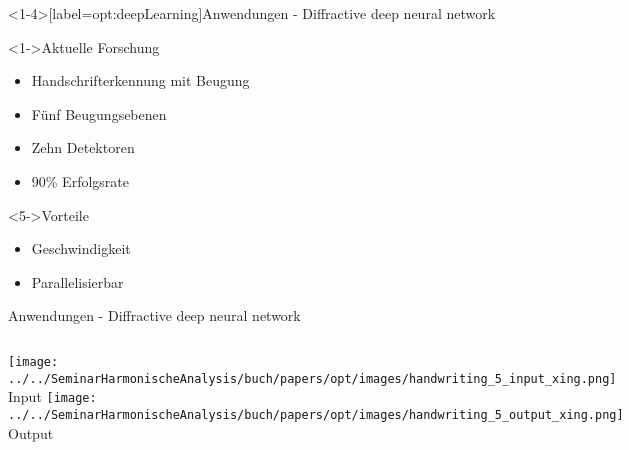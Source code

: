 \begin{frame}<1-4>[label=opt:deepLearning]{Anwendungen - Diffractive deep neural network}
    \begin{block}<1->{Aktuelle Forschung}
        \begin{itemize}
            \item<1-> Handschrifterkennung mit Beugung
            \item<2-> Fünf Beugungsebenen
            \item<3-> Zehn Detektoren
            \item<4-> 90\% Erfolgsrate
        \end{itemize}
    \end{block}
    \begin{block}<5->{Vorteile}
        \begin{itemize}
            \item<5-> Geschwindigkeit
            \item<6-> Parallelisierbar
        \end{itemize}
    \end{block}
\end{frame}


\begin{frame}{Anwendungen - Diffractive deep neural network}
    \centering
    \begin{columns}
        \texttt{[image: ../../SeminarHarmonischeAnalysis/buch/papers/opt/images/handwriting\_5\_input\_xing.png]}
        Input
        \texttt{[image: ../../SeminarHarmonischeAnalysis/buch/papers/opt/images/handwriting\_5\_output\_xing.png]}
        Output
    \end{columns}
\end{frame}

